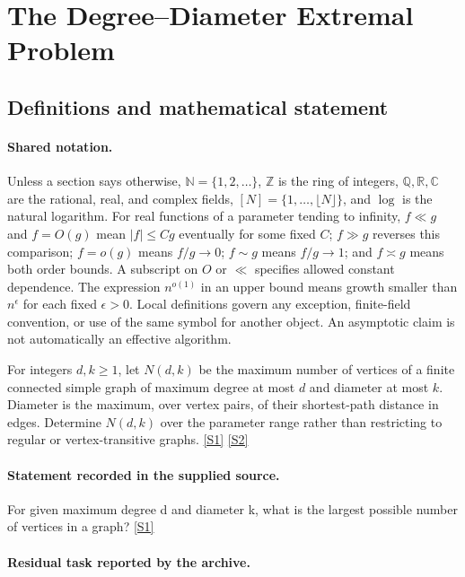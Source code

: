 \documentclass[11pt,a4paper]{article}
\newcommand{\N}{\mathbb{N}}
\newcommand{\Z}{\mathbb{Z}}
\newcommand{\Q}{\mathbb{Q}}
\newcommand{\R}{\mathbb{R}}
\newcommand{\C}{\mathbb{C}}
\newcommand{\sref}[2]{\hyperlink{source:#1:#2}{[S#2]}}
\begin{document}
\section{The Degree--Diameter Extremal Problem}\label{statement}


\subsection{Definitions and mathematical statement}

\paragraph{Shared notation.}Unless a section says otherwise, $\N=\{1,2,\ldots\}$,
$\Z$ is the ring of integers, $\Q,\R,\C$ are the rational, real, and complex
fields, $[N]=\{1,\ldots,\lfloor N\rfloor\}$, and $\log$ is the natural
logarithm. For real functions of a parameter tending to infinity,
$f\ll g$ and $f=O(g)$ mean $|f|\leq Cg$ eventually for some fixed $C$;
$f\gg g$ reverses this comparison; $f=o(g)$ means $f/g\to0$;
$f\sim g$ means $f/g\to1$; and $f\asymp g$ means both order bounds.
A subscript on $O$ or $\ll$ specifies allowed constant dependence.
The expression $n^{o(1)}$ in an upper bound means growth smaller than
$n^\epsilon$ for each fixed $\epsilon>0$. Local definitions govern any
exception, finite-field convention, or use of the same symbol for another
object. An asymptotic claim is not automatically an effective algorithm.



For integers $d,k\geq1$, let $N(d,k)$ be the maximum number of vertices of a finite connected simple graph of maximum degree at most $d$ and diameter at most $k$. Diameter is the maximum, over vertex pairs, of their shortest-path distance in edges. Determine $N(d,k)$ over the parameter range rather than restricting to regular or vertex-transitive graphs. \sref{statement}{1} \sref{statement}{2}

\paragraph{Statement recorded in the supplied source.}
For given maximum degree d and diameter k, what is the largest possible number of vertices in a graph? \sref{statement}{1}

\paragraph{Residual task reported by the archive.}
\end{document}
